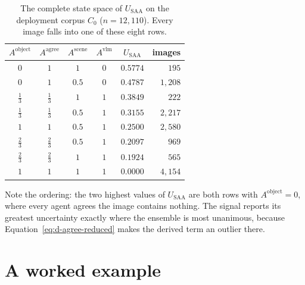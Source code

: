 \documentclass[12pt,a4paper]{report}
\begin{document}
\begin{table}[!htbp]
\centering
\caption[The complete state space of $U_{SAA}$ on the deployment corpus $C_0$]{The complete state space of $U_{\text{SAA}}$ on the deployment corpus $C_0$ ($n=12{,}110$). Every image falls into one of these eight rows.}
\label{tab:state_space}
\small
\begin{tabular}{cccc c r}
\toprule
$A^{\text{object}}$ & $A^{\text{agree}}$ & $A^{\text{scene}}$ & $A^{\text{vlm}}$ & $U_{\text{SAA}}$ & images \\
\midrule
$0$        & $1$        & $1$   & $0$ & $0.5774$ & $195$ \\
$0$        & $1$        & $0.5$ & $0$ & $0.4787$ & $1{,}208$ \\
$\tfrac13$ & $\tfrac13$ & $1$   & $1$ & $0.3849$ & $222$ \\
$\tfrac13$ & $\tfrac13$ & $0.5$ & $1$ & $0.3155$ & $2{,}217$ \\
$1$        & $1$        & $0.5$ & $1$ & $0.2500$ & $2{,}580$ \\
$\tfrac23$ & $\tfrac23$ & $0.5$ & $1$ & $0.2097$ & $969$ \\
$\tfrac23$ & $\tfrac23$ & $1$   & $1$ & $0.1924$ & $565$ \\
$1$        & $1$        & $1$   & $1$ & $0.0000$ & $4{,}154$ \\
\bottomrule
\end{tabular}
\end{table}

Note the ordering: the two highest values of $U_{\text{SAA}}$ are both rows with $A^{\text{object}}=0$, where every agent agrees the image contains nothing. The signal reports its greatest uncertainty exactly where the ensemble is most unanimous, because Equation~\ref{eq:d-agree-reduced} makes the derived term an outlier there.

\section{A worked example}
\end{document}
